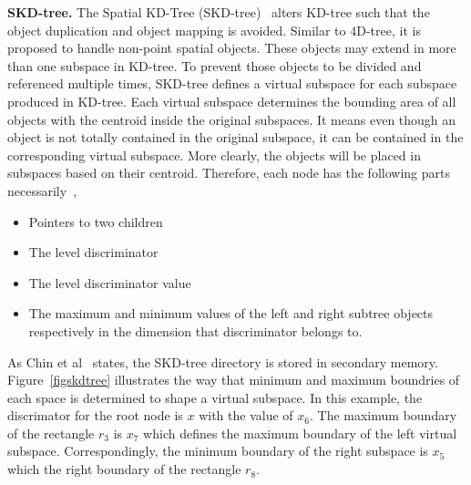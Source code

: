 \documentclass[a4paper,12pt]{article}
\begin{document}
\textbf{SKD-tree.} The Spatial KD-Tree (SKD-tree)~\cite{skdtree} alters KD-tree such that the object duplication and object mapping is avoided. Similar to 4D-tree, it is proposed to handle non-point spatial objects. These objects may extend in more than one subspace in KD-tree. To prevent those objects to be divided and referenced multiple times, SKD-tree defines a virtual subspace for each subspace produced in KD-tree. Each virtual subspace determines the bounding area of all objects with the centroid inside the original subspaces. It means even though an object is not totally contained in the original subspace, it can be contained in the corresponding virtual subspace. More clearly, the objects will be placed in subspaces based on their centroid. Therefore, each node has the following parts necessarily~\cite{skdtreebook},
\begin{itemize}
\item Pointers to two children
\item The level discriminator
\item The level discriminator value
\item The maximum and minimum values of the left and right subtree objects respectively in the dimension that discriminator belongs to.
\end{itemize}    
As Chin et al~\cite{survey} states, the SKD-tree directory is stored in secondary memory. Figure~\ref{figskdtree} illustrates the way that minimum and maximum boundries of each space is determined to shape a virtual subspace. In this example, the discrimator for the root node is $x$ with the value of $x_6$.
The maximum boundary of the rectangle $r_3$ is $x_7$ which defines the maximum boundary of the left virtual subspace. Correspondingly, the minimum boundary of the right subspace is $x_5$ which the right boundary of the rectangle $r_8$.
\end{document}
